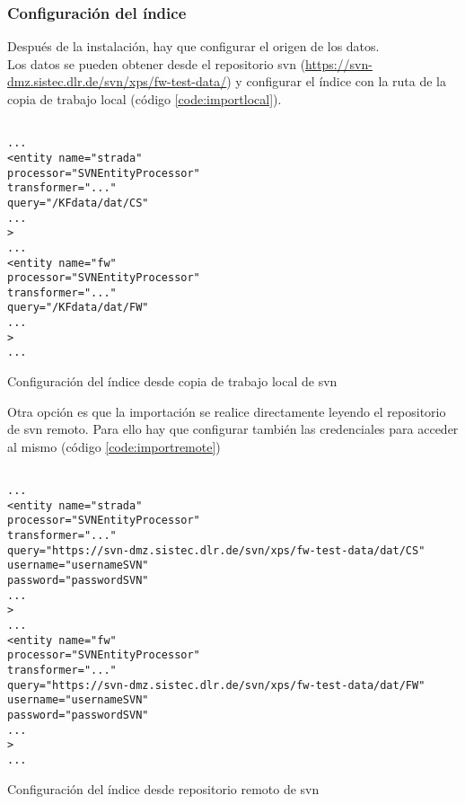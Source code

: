 \subsubsection{Configuración del índice}
Después de la instalación, hay que configurar el origen de los datos.\\

Los datos se pueden obtener desde el repositorio \gls{svn} (\url{https://svn-dmz.sistec.dlr.de/svn/xps/fw-test-data/}) y configurar el índice con la ruta de la copia de trabajo local (código \ref{code:importlocal}).

\begin{listing}[H]
    \begin{verbatim}

...
<entity name="strada"
processor="SVNEntityProcessor"
transformer="..."
query="/KFdata/dat/CS"
...
>
...
<entity name="fw"
processor="SVNEntityProcessor"
transformer="..."
query="/KFdata/dat/FW"
...
>
...
    \end{verbatim}
    \caption{Configuración del índice desde copia de trabajo local de \gls{svn}}
    \label{code:importlocal}
\end{listing}


Otra opción es que la importación se realice directamente leyendo el repositorio de \gls{svn} remoto. Para ello hay que configurar también las credenciales para acceder al mismo (código \ref{code:importremote})\\

\begin{listing}[H]
    \begin{verbatim}

...
<entity name="strada"
processor="SVNEntityProcessor"
transformer="..."
query="https://svn-dmz.sistec.dlr.de/svn/xps/fw-test-data/dat/CS"
username="usernameSVN"
password="passwordSVN"
...
>
...
<entity name="fw"
processor="SVNEntityProcessor"
transformer="..."
query="https://svn-dmz.sistec.dlr.de/svn/xps/fw-test-data/dat/FW"
username="usernameSVN"
password="passwordSVN"
...
>
...
    \end{verbatim}
    \caption{Configuración del índice desde repositorio remoto de \gls{svn}}
    \label{code:importremote}
\end{listing}


